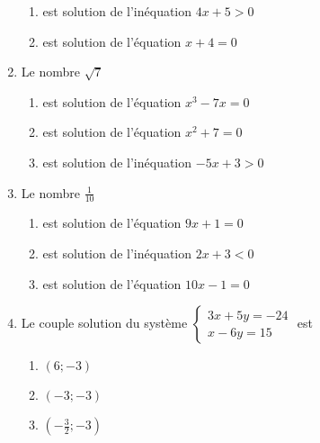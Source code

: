 \documentclass[oneside,twoside]{book}
\begin{document}
\begin{enumerate}
\begin{enumerate}
\item\BonneReponse est solution de l'inéquation $4x+5>0$

\item\MauvaiseReponse est solution de l'équation $x+4=0$


\end{enumerate}



\item Le nombre $\sqrt{7}$

\begin{enumerate}

\item\BonneReponse est solution de l'équation $x^{3}-7x=0$

\item\MauvaiseReponse est solution de l'équation $x^{2}+7=0$


\item\MauvaiseReponse est solution de l'inéquation $-5x+3>0$

\end{enumerate}



\item Le nombre $\frac{1}{10}$

\begin{enumerate}

\item\MauvaiseReponse est solution de l'équation $9x+1=0$


\item\MauvaiseReponse est solution de l'inéquation $2x+3<0$

\item\BonneReponse est solution de l'équation $10x-1=0$

\end{enumerate}

\newpage

\item Le couple solution du système $\left\{\begin{array}{c}3x+5y=-24 \\ x-6y=15\end{array}\right.$ est

\begin{enumerate}

\item\MauvaiseReponse $(6;-3)$

\item\BonneReponse $(-3 ;-3)$

\item\MauvaiseReponse $(-\frac{3}{2} ; -3)$



\end{enumerate}
\end{enumerate}
\end{document}
